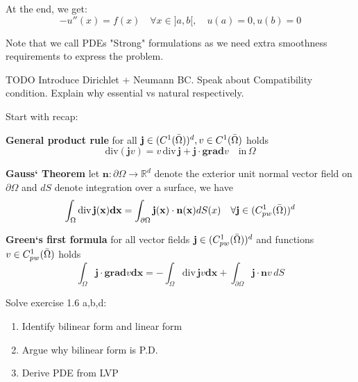 At the end, we get:
\begin{equation}
    -u''(x) = f(x) \quad \forall x \in ]a, b[, \quad u(a) = 0, u(b) = 0
\end{equation}

Note that we call PDEs "Strong" formulations as we need extra smoothness requirements to express the problem.



TODO
Introduce Dirichlet + Neumann BC. Speak about Compatibility condition. Explain why essential vs natural respectively.





Start with recap:

\textbf{General product rule} \newline
for all $\mathbf{j} \in (C^1(\Bar{\Omega}))^d, v \in C^1(\Bar{\Omega})$ holds $$\text{div} (\mathbf{j}v) = v\, \text{div}\, \mathbf{j} + \mathbf{j \cdot grad} v \quad\text{in}\, \Omega$$

\textbf{Gauss` Theorem} \newline
let $\mathbf{n} : \partial \Omega\rightarrow \mathbb{R}^d$ denote the exterior unit normal vector field on $\partial\Omega$ and $dS$ denote integration over a surface, we have $$\int_\Omega \text{div}\, \mathbf{j(x)dx} = \int_{\partial\Omega} \mathbf{j(x)\cdot n(x)}dS(x)\quad \forall \mathbf{j} \in (C^1_{pw}(\Bar{\Omega}))^d$$

\textbf{Green`s first formula} \newline
for all vector fields $\mathbf{j} \in (C^1_{pw}(\Bar{\Omega}))^d$ and functions $v\in C^1_{pw}(\Bar{\Omega})$ holds $$\int_\Omega \mathbf{j \cdot grad}v \mathbf{dx} = - \int_\Omega \text{div}\,\mathbf{j}v\mathbf{dx} + \int_{\partial\Omega} \mathbf{j \cdot n} v\, dS$$

Solve exercise 1.6 a,b,d:


\begin{enumerate}
    \item Identify bilinear form and linear form
    \item Argue why bilinear form is P.D.
    \item Derive PDE from LVP
\end{enumerate}

